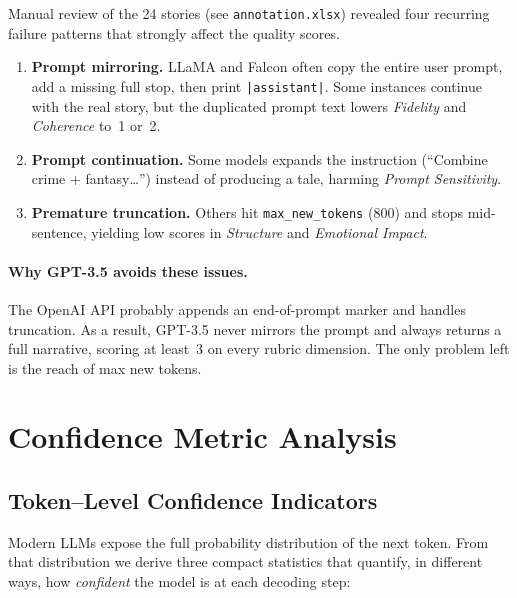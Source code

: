 \documentclass[12pt]{article}
\begin{document}
Manual review of the 24 stories (see \texttt{annotation.xlsx})
revealed four recurring failure patterns that strongly affect the
quality scores.  
\begin{enumerate}
    \item \textbf{Prompt mirroring.}  
          LLaMA and Falcon often copy the entire user prompt, add a
          missing full stop, then print \texttt{|assistant|}.  
          Some instances continue with the real story, but the
          duplicated prompt text lowers \emph{Fidelity} and
          \emph{Coherence} to~1 or~2.
    \item \textbf{Prompt continuation.}  
          Some models expands the instruction
          (“Combine crime + fantasy…”) instead of producing a tale,
          harming \emph{Prompt Sensitivity}.
    \item \textbf{Premature truncation.}  
          Others hit \texttt{max\_new\_tokens} (800) and stops
          mid-sentence, yielding low scores in
          \emph{Structure} and \emph{Emotional Impact}.
\end{enumerate}

\paragraph{Why GPT-3.5 avoids these issues.}
The OpenAI API probably appends an end-of-prompt marker and handles
truncation.  As a result, GPT-3.5 never mirrors the prompt and always
returns a full narrative, scoring at least~3 on every rubric dimension. The only problem left is the reach of max new tokens.



\newpage

\section{Confidence Metric Analysis}

\subsection{Token--Level Confidence Indicators}
Modern LLMs expose the full probability distribution of the next token.  
From that distribution we derive three compact statistics that quantify, in different ways, how \emph{confident} the model is at each decoding step:
\end{document}

